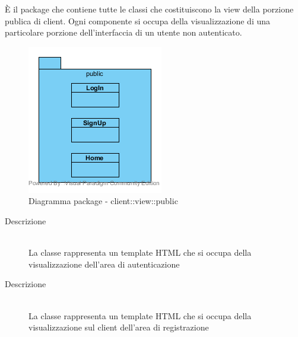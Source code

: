 È il package che contiene tutte le classi che costituiscono la view della porzione publica di client. Ogni componente si occupa della visualizzazione di una particolare porzione dell'interfaccia di un utente non autenticato.\begin{center}
	\begin{figure}[H]
		\centering \includegraphics[scale=4, max width=\textwidth, max height=\myheight]{../img/diagrammiClassi/client/view/public.png}
		\caption{Diagramma package - client::view::public}
	\end{figure}
\end{center}\hypertarget{client::view::public::LogIn}{}
\begin{description}
\item[Descrizione] \hfill \\
La classe rappresenta un template HTML che si occupa della visualizzazione dell'area di autenticazione
\end{description}

\vspace{0.5cm}
\hypertarget{client::view::public::SignUp}{}
\begin{description}
\item[Descrizione] \hfill \\
La classe rappresenta un template HTML che si occupa della visualizzazione sul client dell'area di registrazione
\end{description}

